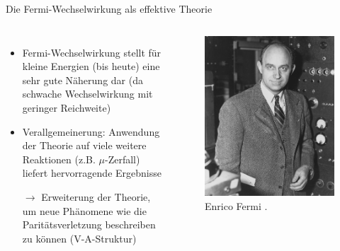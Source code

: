 \documentclass[aspectratio=1610, professionalfonts, 10pt]{beamer}
\begin{document}
\begin{frame}{Die Fermi-Wechselwirkung als effektive Theorie}
	\begin{columns}
			\begin{itemize}
				\setlength\itemsep{0.5em}
				\item Fermi-Wechselwirkung stellt für kleine Energien (bis heute) eine sehr gute Näherung dar (da schwache Wechselwirkung mit geringer Reichweite)
				\item Verallgemeinerung: Anwendung der Theorie auf viele weitere Reaktionen (z.B. $\mu$-Zerfall) liefert hervorragende Ergebnisse
				\item [$\rightarrow$] Erweiterung der Theorie, um neue Phänomene wie die Paritätsverletzung beschreiben zu können (V-A-Struktur)
			\end{itemize}
			\begin{figure}
	  			\centering
				\includegraphics[width=\linewidth]{Images/Enrico_Fermi_1943-49.jpg}
	  			\caption{Enrico Fermi \cite{wiki:fermi}.}
	  			\label{fig:fermi}
			\end{figure}
	\end{columns}
\end{frame}
\end{document}
